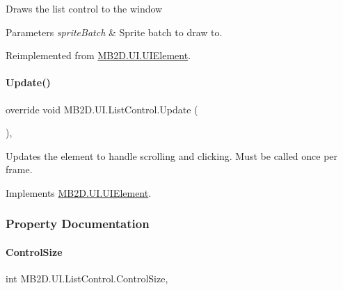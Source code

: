 Draws the list control to the window 


\begin{DoxyParams}{Parameters}
{\em sprite\+Batch} & Sprite batch to draw to.\\
\hline
\end{DoxyParams}


Reimplemented from \hyperlink{class_m_b2_d_1_1_u_i_1_1_u_i_element_afec98e6e38cb0dbc17a5db6d6a3d5ba5}{M\+B2\+D.\+U\+I.\+U\+I\+Element}.

\hypertarget{class_m_b2_d_1_1_u_i_1_1_list_control_a48587bc052ca0d3d28bd968369024e14}{}\label{class_m_b2_d_1_1_u_i_1_1_list_control_a48587bc052ca0d3d28bd968369024e14} 
\paragraph{\texorpdfstring{Update()}{Update()}}
{\footnotesize\ttfamily override void M\+B2\+D.\+U\+I.\+List\+Control.\+Update (\begin{DoxyParamCaption}{ }\end{DoxyParamCaption})\hspace{0.3cm}{\ttfamily [inline]}, {\ttfamily [virtual]}}



Updates the element to handle scrolling and clicking. Must be called once per frame. 



Implements \hyperlink{class_m_b2_d_1_1_u_i_1_1_u_i_element_aa97bcbe44f3fac8a13e2febca23b2d4d}{M\+B2\+D.\+U\+I.\+U\+I\+Element}.



\subsubsection{Property Documentation}
\hypertarget{class_m_b2_d_1_1_u_i_1_1_list_control_aafbb7c455f4ba9832be33a603287ed08}{}\label{class_m_b2_d_1_1_u_i_1_1_list_control_aafbb7c455f4ba9832be33a603287ed08} 
\paragraph{\texorpdfstring{Control\+Size}{ControlSize}}
{\footnotesize\ttfamily int M\+B2\+D.\+U\+I.\+List\+Control.\+Control\+Size\hspace{0.3cm}{\ttfamily [get]}, {\ttfamily [set]}}



